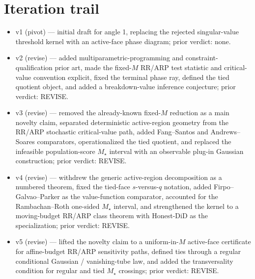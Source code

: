 \documentclass[11pt]{article}
\theoremstyle{definition}
\theoremstyle{plain}
\theoremstyle{remark}
\begin{document}
\section{Iteration trail}
\begin{itemize}[leftmargin=*]
\item v1 (pivot) --- initial draft for angle 1, replacing the rejected
singular-value threshold kernel with an active-face phase diagram; prior
verdict: none.
\item v2 (revise) --- added multiparametric-programming and
constraint-qualification prior art, made the fixed-\(M\) RR/ARP test statistic
and critical-value convention explicit, fixed the terminal phase ray, defined
the tied quotient object, and added a breakdown-value inference conjecture;
prior verdict: REVISE.
\item v3 (revise) --- removed the already-known fixed-\(M\) reduction as a
main novelty claim, separated deterministic active-region geometry from the
RR/ARP stochastic critical-value path, added Fang--Santos and Andrews--Soares
comparators, operationalized the tied quotient, and replaced the infeasible
population-score \(M_\star\) interval with an observable plug-in Gaussian
construction; prior verdict: REVISE.
\item v4 (revise) --- withdrew the generic active-region decomposition as a
numbered theorem, fixed the tied-face \(s\)-versus-\(q\) notation, added
Firpo--Galvao--Parker as the value-function comparator, accounted for the
Rambachan--Roth one-sided \(M_\star\) interval, and strengthened the kernel to
a moving-budget RR/ARP class theorem with Honest-DiD as the specialization;
prior verdict: REVISE.
\item v5 (revise) --- lifted the novelty claim to a uniform-in-\(M\)
active-face certificate for affine-budget RR/ARP sensitivity paths, defined
ties through a regular conditional Gaussian / vanishing-tube law, and added
the transversality condition for regular and tied \(M_\star\) crossings; prior
verdict: REVISE.
\end{itemize}
\end{document}
